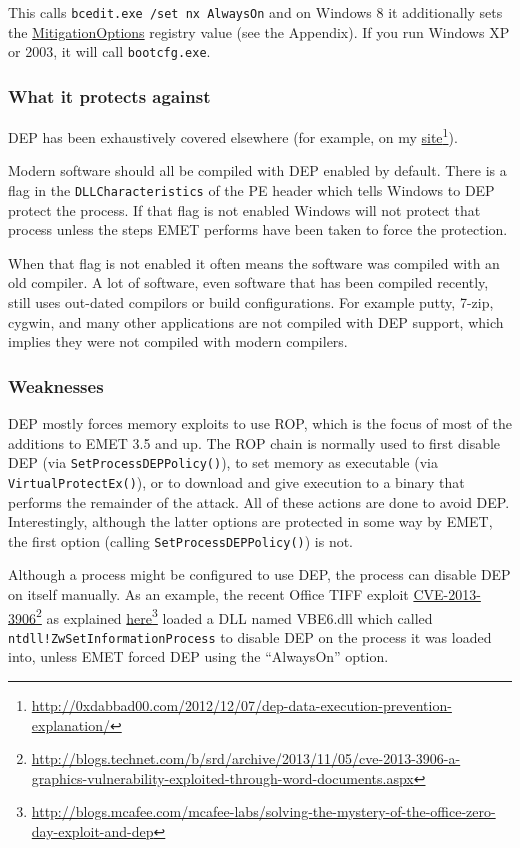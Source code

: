 \documentclass[]{article}
\newcommand{\fhref}[2]{\href{#1}{#2}\footnote{\url{#1}}}
\begin{document}
This calls \texttt{bcedit.exe /set nx AlwaysOn} and on Windows 8 it additionally sets the \hyperref[MitigationOptions]{MitigationOptions} registry value (see the Appendix). If you run Windows XP or 2003, it will call \texttt{bootcfg.exe}.

\subsubsection{What it protects against}

DEP has been exhaustively covered elsewhere (for example, on my
\fhref{http://0xdabbad00.com/2012/12/07/dep-data-execution-prevention-explanation/}{site}\cite{dep_explained}).


Modern software should all be compiled with DEP enabled by default.  There is a flag in the \texttt{DLLCharacteristics} of the PE header which tells Windows to DEP protect the process.  
If that flag is not enabled Windows will not protect that process unless the steps EMET performs have been taken to force the protection.

When that flag is not enabled it often means the software was compiled with an old compiler.
A lot of software, even software that has been compiled recently,
still uses out-dated compilors or build configurations.
For example putty,
7-zip, cygwin, and many other applications are not compiled with DEP support, which implies they were not compiled with modern compilers.


\subsubsection{Weaknesses}

DEP mostly forces memory exploits to use ROP, which is the focus of most
of the additions to EMET 3.5 and up. 
The ROP chain is normally used to first disable DEP (via \texttt{SetProcessDEPPolicy()}), 
to set memory as executable (via \texttt{VirtualProtectEx()}),
or to download and give execution to a binary that performs the remainder of the attack.  All of these actions are done to avoid DEP.  Interestingly, although the latter options are protected in some way by EMET, the first option (calling \texttt{SetProcessDEPPolicy()}) is not.


Although a process might be configured to use DEP, the process can disable DEP on itself manually.  As an example, the recent Office TIFF exploit
\fhref{http://blogs.technet.com/b/srd/archive/2013/11/05/cve-2013-3906-a-graphics-vulnerability-exploited-through-word-documents.aspx}{CVE-2013-3906}\cite{CVE_2013_3906}
as explained
\fhref{http://blogs.mcafee.com/mcafee-labs/solving-the-mystery-of-the-office-zero-day-exploit-and-dep}{here}\cite{CVE_2013_3906_mcafee}
loaded a DLL named VBE6.dll which called \texttt{ntdll!ZwSetInformationProcess} to disable DEP on the process it was loaded into, unless EMET forced DEP using the ``AlwaysOn'' option.
\end{document}
